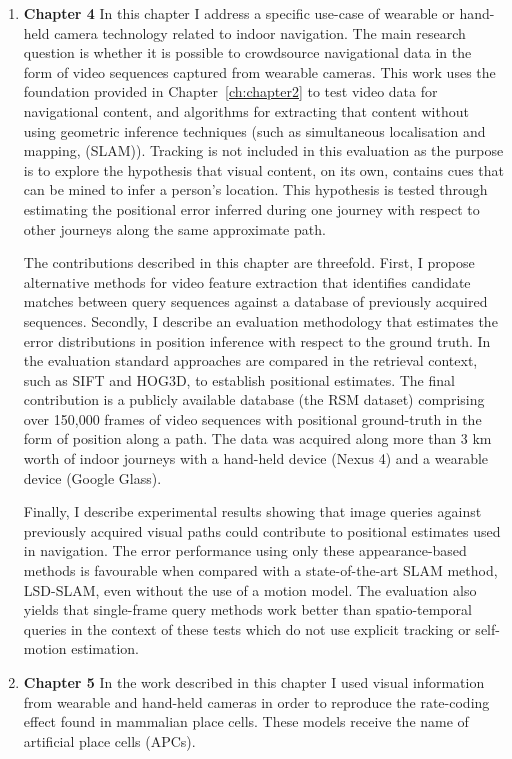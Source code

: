 \begin{enumerate}

\item \textbf{Chapter 4} In this chapter I address a specific use-case of wearable or hand-held camera technology related to indoor navigation. The main research question is whether it is possible to crowdsource navigational data in the form of video sequences captured from wearable cameras.  This work uses the foundation provided in Chapter~\ref{ch:chapter2} to test video data for navigational content, and algorithms for extracting that content without using geometric inference techniques (such as simultaneous localisation and mapping, (SLAM)).  Tracking is not included in this evaluation as the purpose is to explore the hypothesis that visual content, on its own, contains cues that can be mined to infer a person's location.  This hypothesis is tested through estimating the positional error inferred during one journey with respect to other journeys along the same approximate path.

The contributions described in this chapter are threefold. First, I propose alternative methods for video feature extraction that identifies candidate matches between query sequences against a database of previously acquired sequences. Secondly, I describe an evaluation methodology that estimates the error distributions in position inference with respect to the ground truth. In the evaluation standard approaches are compared in the retrieval context, such as SIFT and HOG3D, to establish positional estimates. The final contribution is a publicly available database (the RSM dataset) comprising over 150,000 frames of video sequences with positional ground-truth in the form of position along a path. The data was acquired along more than 3 km worth of indoor journeys with a hand-held device (Nexus 4) and a wearable device (Google Glass).

Finally, I describe experimental results showing that image queries against previously acquired visual paths could contribute to positional estimates used in navigation. The error performance using only these appearance-based methods is favourable when compared with a state-of-the-art SLAM method, LSD-SLAM, even without the use of a motion model. The evaluation also yields that single-frame query methods work better than spatio-temporal queries in the context of these tests which do not use explicit tracking or self-motion estimation. 

\item \textbf{Chapter 5} In the work described in this chapter I used visual information from wearable and hand-held cameras in order to reproduce the rate-coding effect found in mammalian place cells. These models receive the name of artificial place cells (APCs). 


\end{enumerate}
